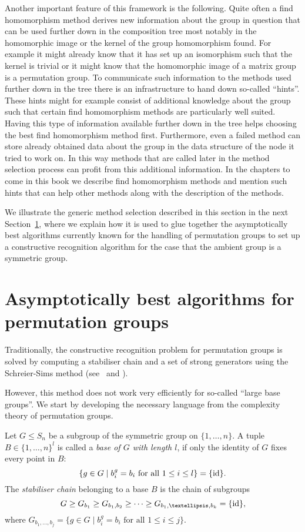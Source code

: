 Another important feature of this framework is the following. Quite often
a find homomorphism method derives new information about the group in
question that can be used further down in the composition tree most notably
in the homomorphic image or the kernel of the group homomorphism found.
For example it might already know that it has set up an isomorphism such
that the kernel is trivial or it might know that the homomorphic image of a
matrix group is a permutation group. To communicate such information to the
methods used further down in the tree there is an infrastructure to hand
down so-called ``hints''. These hints might for example consist of additional
%
knowledge about the group such that certain find homomorphism methods
are particularly well suited. Having this type of information available
further down in the tree helps choosing the best find homomorphism method
first. Furthermore, even a failed method can store already 
obtained data about the group in the data structure of the node it tried
to work on. In this way methods that are called later in the method
selection process can profit from this additional information. In the
chapters to come in this book we describe find homomorphism methods
and mention such hints that can help other methods along with the
description of the methods.

We illustrate the generic method selection described in this section
in the next Section~\ref{permgrps}, where we explain how it is used to
glue together the asymptotically best algorithms currently known for
the handling of permutation groups to set up a constructive recognition
algorithm for the case that the ambient group is a symmetric group.


\section{Asymptotically best algorithms for permutation groups}
\label{permgrps}

Traditionally, the constructive recognition problem for permutation
groups is solved by computing a stabiliser chain and a set of strong
generators using the Schreier-Sims method (see~\cite{Si} and \cite{Ser}). 

However, this method does not work very efficiently for so-called
``large base groups''. We start by developing the necessary language
from the complexity theory of permutation groups.

\begin{Def}
%
Let $G \le S_n$ be a subgroup of the symmetric group on $\{1,\ldots,n\}$.
A tuple $B \in \{ 1, \ldots, n\}^l$ is called a \emph{base of $G$ with
length $l$}, if only the identity of $G$ fixes every point in $B$: 
\[ \{ g \in G \mid b_i^g = b_i \mbox{ for all } 1 \le i \le l \} = \{ \id \}. \]
The \emph{stabiliser chain} belonging to a base $B$ is the chain of
subgroups
\[ G \ge G_{b_1} \ge G_{b_1,b_2} \ge \cdots \ge G_{b_1,\ldots,b_k} =
\{\id\}, \]
where $G_{b_1, \ldots, b_j} =
\{ g \in G \mid b_i^g = b_i \mbox{ for all } 1 \le i \le j \}$.
\end{Def}

